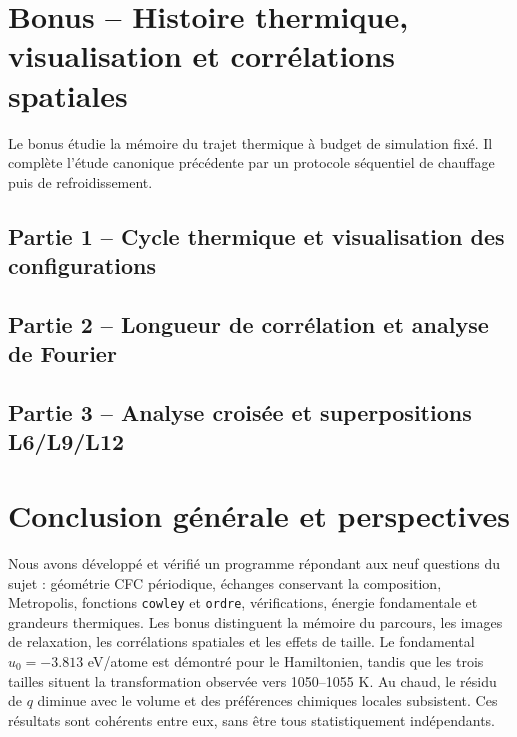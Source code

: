 \documentclass[10pt,a4paper]{article}
\begin{document}
\section{Bonus -- Histoire thermique, visualisation et corrélations spatiales}
\label{sec:bonus-cycle}
Le bonus étudie la mémoire du trajet thermique à budget de simulation
fixé. Il complète l'étude canonique précédente par un protocole
séquentiel de chauffage puis de refroidissement.
\subsection{Partie 1 -- Cycle thermique et visualisation des configurations}
\begingroup\sloppy
{}
\subsection{Partie 2 -- Longueur de corrélation et analyse de Fourier}
\subsection{Partie 3 -- Analyse croisée et superpositions L6/L9/L12}
\label{sec:tailles}
\endgroup

\section{Conclusion générale et perspectives}
\label{sec:conclusion-generale}
Nous avons développé et vérifié un programme répondant aux neuf questions
du sujet : géométrie CFC périodique,
échanges conservant la composition, Metropolis, fonctions \texttt{cowley}
et \texttt{ordre}, vérifications, énergie fondamentale et grandeurs
thermiques. Les bonus distinguent la mémoire du parcours, les images
de relaxation, les corrélations spatiales et les effets de taille.
Le fondamental $u_0=-3.813$ eV/atome est démontré pour le Hamiltonien,
tandis que les trois tailles situent la transformation observée vers
1050--1055 K. Au chaud, le résidu de $q$ diminue avec le volume et des
préférences chimiques locales subsistent. Ces résultats sont cohérents
entre eux, sans être tous statistiquement indépendants.
\end{document}
